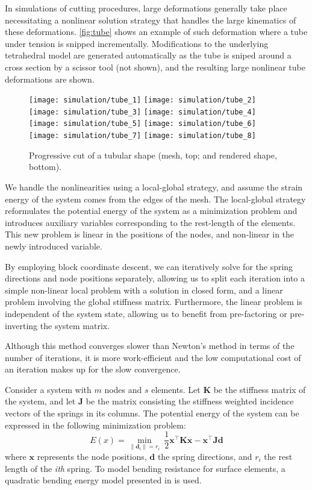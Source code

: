 In simulations of cutting procedures, large deformations generally take place necessitating a nonlinear solution strategy that handles the large kinematics of these deformations. \autoref{fig:tube} shows an example of such deformation where a tube under tension is snipped incrementally. Modifications to the underlying tetrahedral model are generated automatically as the tube is sniped around a cross section by a scissor tool (not shown), and the resulting large nonlinear tube deformations are shown.

\begin{figure}
  \centering%
	\texttt{[image: simulation/tube\_1]}\hfill%
	\texttt{[image: simulation/tube\_2]}\hfill%
	\texttt{[image: simulation/tube\_3]}\hfill%
	\texttt{[image: simulation/tube\_4]}\\

  \centering%
	\texttt{[image: simulation/tube\_5]}\hfill%
	\texttt{[image: simulation/tube\_6]}\hfill%
	\texttt{[image: simulation/tube\_7]}\hfill%
	\texttt{[image: simulation/tube\_8]}\\
	\caption{Progressive cut of a tubular shape (mesh, top; and rendered shape, bottom).}\label{fig:tube}
\end{figure}

We handle the nonlinearities using a local-global strategy, and assume the strain energy of the system comes from the edges of the mesh. The local-global strategy reformulates the potential energy of the system as a minimization problem and introduces auxiliary variables corresponding to the rest-length of the elements. This new problem is linear in the positions of the nodes, and non-linear in the newly introduced variable.

By employing block coordinate descent, we can iteratively solve for the spring directions and node positions separately, allowing us to split each iteration into a simple non-linear local problem with a solution in closed form, and a linear problem involving the global stiffness matrix. Furthermore, the linear problem is independent of the system state, allowing us to benefit from pre-factoring or pre-inverting the system matrix.

Although this method converges slower than Newton's method in terms of the number of iterations, it is more work-efficient and the low computational cost of an iteration makes up for the slow convergence.

Consider a system with $m$ nodes and $s$ elements. Let $\mathbf{K}$ be the stiffness matrix of the system, and let $\mathbf{J}$ be the matrix consisting the stiffness weighted incidence vectors of the springs in its columns. The potential energy of the system can be expressed in the following minimization problem:
\begin{equation}
  E(x) = \min_{\|\mathbf{d}_i\| = r_i} \
  \frac{1}{2}\mathbf{x}^\intercal\mathbf{Kx} -
  \mathbf{x}^\intercal\mathbf{Jd}
\end{equation}
where $\mathbf{x}$ represents the node positions, $\mathbf{d}$ the spring directions, and $r_i$ the rest length of the \textit{ith} spring. To model bending resistance for surface elements, a quadratic bending energy model presented in \cite{Bergou06} is used.

